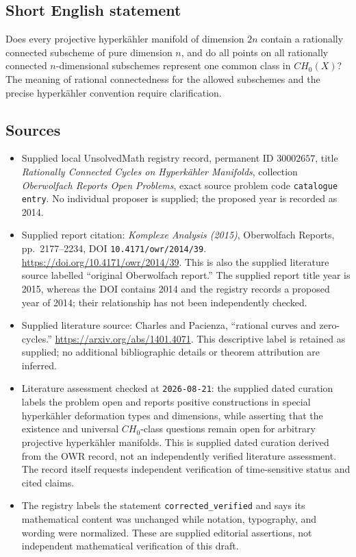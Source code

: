 \documentclass[11pt]{article}
\begin{document}
\subsection{Short English statement}
Does every projective hyperkähler manifold of dimension \(2n\) contain a rationally connected subscheme of pure dimension \(n\), and do all points on all rationally connected \(n\)-dimensional subschemes represent one common class in \(CH_0(X)\)? The meaning of rational connectedness for the allowed subschemes and the precise hyperkähler convention require clarification.
\subsection{Sources}
\begin{itemize}
\item Supplied local UnsolvedMath registry record, permanent ID \(30002657\), title \emph{Rationally Connected Cycles on Hyperkähler Manifolds}, collection \emph{Oberwolfach Reports Open Problems}, exact source problem code \texttt{catalogue entry}. No individual proposer is supplied; the proposed year is recorded as 2014.
\item Supplied report citation: \emph{Komplexe Analysis (2015)}, Oberwolfach Reports, pp.~2177--2234, DOI \texttt{10.4171/owr/2014/39}. \url{https://doi.org/10.4171/owr/2014/39}. This is also the supplied literature source labelled ``original Oberwolfach report.'' The supplied report title year is 2015, whereas the DOI contains 2014 and the registry records a proposed year of 2014; their relationship has not been independently checked.
\item Supplied literature source: Charles and Pacienza, ``rational curves and zero-cycles.'' \url{https://arxiv.org/abs/1401.4071}. This descriptive label is retained as supplied; no additional bibliographic details or theorem attribution are inferred.
\item Literature assessment checked at \texttt{2026-08-21}: the supplied dated curation labels the problem open and reports positive constructions in special hyperkähler deformation types and dimensions, while asserting that the existence and universal \(CH_0\)-class questions remain open for arbitrary projective hyperkähler manifolds. This is supplied dated curation derived from the OWR record, not an independently verified literature assessment. The record itself requests independent verification of time-sensitive status and cited claims.
\item The registry labels the statement \texttt{corrected\_verified} and says its mathematical content was unchanged while notation, typography, and wording were normalized. These are supplied editorial assertions, not independent mathematical verification of this draft.
\end{itemize}
\end{document}
